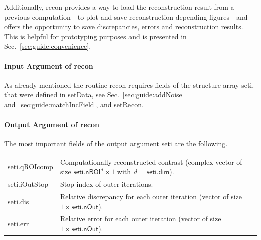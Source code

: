 \documentclass[a4paper]{article}
\begin{document}
Additionally, \textsf{recon} provides a way to load the reconstruction result from a previous computation---to plot and save reconstruction-depending figures---and offers the opportunity to save discrepancies, errors and reconstruction results. This is helpful for prototyping purposes and is presented in Sec.~\ref{sec:guide:convenience}.

\paragraph{Input Argument of \textsf{recon}} As already mentioned the routine \textsf{recon} requires fields of the structure array \textsf{seti}, that were defined in \textsf{setData}, see Sec.~\ref{sec:guide:addNoise} and~\ref{sec:guide:matchIncField}, and \textsf{setRecon}.

\paragraph{Output Argument of \textsf{recon}} The most important fields of the output argument \textsf{seti} are the following.

\noindent\begin{tabular}[t]{p{2.3cm} p{13.3cm}}
\textsf{seti.qROIcomp} & Computationally reconstructed contrast (complex vector of size $\textsf{seti.nROI}^d \times 1$ with $d = \textsf{seti.dim}$).\\
\textsf{seti.iOutStop} & Stop index of outer iterations.\\
\textsf{seti.dis} & Relative discrepancy for each outer iteration (vector of size $1 \times \textsf{seti.nOut}$).\\
\textsf{seti.err} & Relative error for each outer iteration (vector of size $1 \times \textsf{seti.nOut}$).
\end{tabular}
\end{document}
